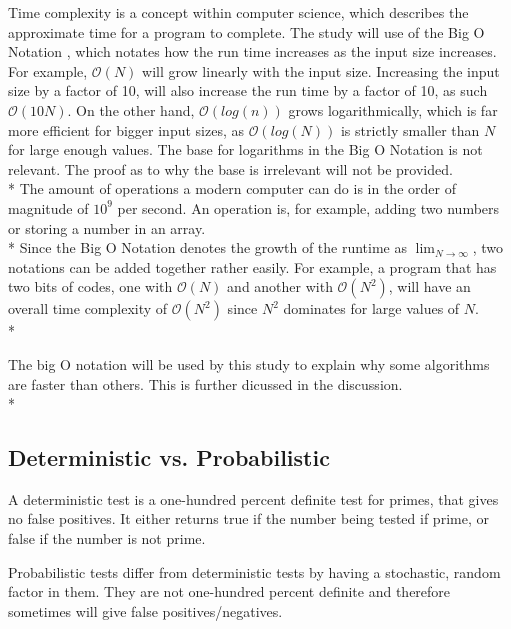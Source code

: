 \documentclass[main.tex]{subfiles}
\begin{document}
Time complexity \cite{theorem:time_comp} is a concept within computer science,
which describes the approximate time for a program to complete. The study will
use of the Big O Notation \cite{theorem:big_O}, which notates how the run time
increases as the input size increases. For example, $\mathcal{O}(N)$ will grow
linearly with the input size. Increasing the input size by a factor of 10, will
also increase the run time by a factor of 10, as such $\mathcal{O}(10N)$. On the
other hand, $\mathcal{O}(log(n))$ grows logarithmically, which is far more
efficient for bigger input sizes, as $\mathcal{O}(log(N))$ is strictly smaller
than $N$ for large enough values. The base for logarithms in the Big O Notation
is not relevant. The proof as to why the base is irrelevant will not be
provided. \newline
\\*
The amount of operations a modern computer can do is in the order of magnitude
of $10^{9}$ per second. An operation is, for example, adding two numbers or
storing a number in an array. \newline
\\*
Since the Big O Notation denotes the growth of the runtime as
$\lim_{N\to\infty}$, two notations can be added together rather easily. For
example, a program that has two bits of codes, one with $\mathcal{O}(N)$ and
another with $\mathcal{O}(N^{2})$, will have an overall time complexity of
$\mathcal{O}(N^{2})$ since $N^{2}$ dominates for large values of $N$. \newline
\\*

The big O notation will be used by this study to explain why some algorithms are
faster than others. This is further dicussed in the discussion.
\\*

\subsection{Deterministic vs. Probabilistic}
A deterministic test is a one-hundred percent definite test for primes, that
gives no false positives. It either returns true if the number being tested if
prime, or false if the number is not prime. \newline

Probabilistic tests differ from deterministic tests by having a stochastic,
random factor in them. They are not one-hundred percent definite and therefore
sometimes will give false positives/negatives. \\
\end{document}
